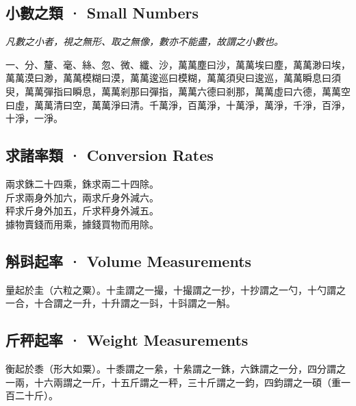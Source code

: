 \documentclass[11pt,a4paper]{article}
\begin{document}
\subsection{小數之類 · Small Numbers}

\textit{凡數之小者，視之無形、取之無像，數亦不能盡，故謂之小數也。}

\medskip

\noindent
一、分、釐、毫、絲、忽、微、纖、沙，萬萬塵曰沙，萬萬埃曰塵，萬萬渺曰埃，萬萬漠曰渺，萬萬模糊曰漠，萬萬逡巡曰模糊，萬萬須臾曰逡巡，萬萬瞬息曰須臾，萬萬彈指曰瞬息，萬萬剎那曰彈指，萬萬六德曰剎那，萬萬虛曰六德，萬萬空曰虛，萬萬清曰空，萬萬淨曰清。千萬淨，百萬淨，十萬淨，萬淨，千淨，百淨，十淨，一淨。

\subsection{求諸率類 · Conversion Rates}

\noindent
兩求銖二十四乘，銖求兩二十四除。\\[2pt]
斤求兩身外加六，兩求斤身外減六。\\[2pt]
秤求斤身外加五，斤求秤身外減五。\\[2pt]
據物賣錢而用乘，據錢買物而用除。

\subsection{斛㪷起率 · Volume Measurements}

\noindent
量起於圭（六粒之粟）。十圭謂之一撮，十撮謂之一抄，十抄謂之一勺，十勺謂之一合，十合謂之一升，十升謂之一㪷，十㪷謂之一斛。

\subsection{斤秤起率 · Weight Measurements}

\noindent
衡起於黍（形大如粟）。十黍謂之一絫，十絫謂之一銖，六銖謂之一分，四分謂之一兩，十六兩謂之一斤，十五斤謂之一秤，三十斤謂之一鈞，四鈞謂之一碩（重一百二十斤）。
\end{document}
